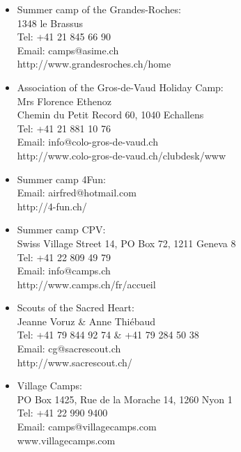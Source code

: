 \begin{itemize}
\vspace{4pt}
\item Summer camp of the Grandes-Roches: \\
1348 le Brassus \\
Tel: +41 21 845 66 90 \\
Email: camps@asime.ch \\
http://www.grandesroches.ch/home 

\vspace{4pt}
\item Association of the Gros-de-Vaud Holiday Camp: \\
Mrs Florence Ethenoz \\
Chemin du Petit Record 60, 1040 Echallens \\
Tel: +41 21 881 10 76 \\
Email: info@colo-gros-de-vaud.ch \\
http://www.colo-gros-de-vaud.ch/clubdesk/www

\vspace{4pt}
\item Summer camp 4Fun: \\
Email: airfred@hotmail.com \\
http://4-fun.ch/ 

\vspace{4pt}
\item Summer camp CPV: \\
Swiss Village Street 14, PO Box 72, 1211 Geneva 8 \\
Tel: +41 22 809 49 79 \\
Email: info@camps.ch \\
http://www.camps.ch/fr/accueil 

\vspace{4pt}
\item Scouts of the Sacred Heart: \\
Jeanne Voruz \& Anne Thiébaud \\
Tel: +41 79 844 92 74 \& +41 79 284 50 38 \\
Email: cg@sacrescout.ch \\
http://www.sacrescout.ch/ 

\vspace{4pt}
\item Village Camps: \\
PO Box 1425, Rue de la Morache 14, 1260 Nyon 1 \\
Tel: +41 22 990 9400 \\
Email: camps@villagecamps.com \\
www.villagecamps.com


\end{itemize}

